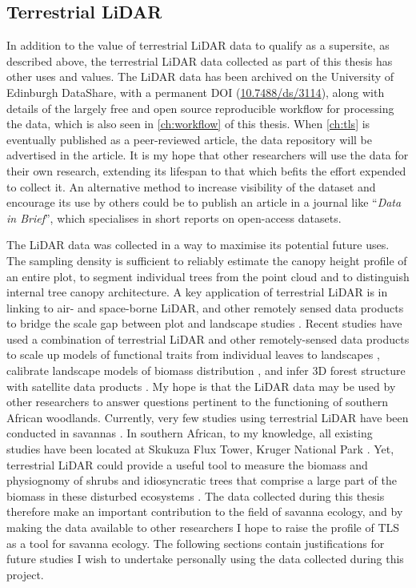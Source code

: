 \begin{refsection}
\section{Terrestrial LiDAR}
\label{legacy:sec:lidar}

In addition to the value of terrestrial LiDAR data to qualify as a supersite, as described above, the terrestrial LiDAR data collected as part of this thesis has other uses and values. The LiDAR data has been archived on the University of Edinburgh DataShare, with a permanent DOI (\href{https://doi.org/10.7488/ds/3114}{10.7488/ds/3114}), along with details of the largely free and open source reproducible workflow for processing the data, which is also seen in \autoref{ch:workflow} of this thesis. When \autoref{ch:tls} is eventually published as a peer-reviewed article, the data repository will be advertised in the article. It is my hope that other researchers will use the data for their own research, extending its lifespan to that which befits the effort expended to collect it. An alternative method to increase visibility of the dataset and encourage its use by others could be to publish an article in a journal like ``\textit{Data in Brief}'', which specialises in short reports on open-access datasets.

The LiDAR data was collected in a way to maximise its potential future uses. The sampling density is sufficient to reliably estimate the canopy height profile of an entire plot, to segment individual trees from the point cloud and to distinguish internal tree canopy architecture. A key application of terrestrial LiDAR is in linking to air- and space-borne LiDAR, and other remotely sensed data products to bridge the scale gap between plot and landscape studies \citep{Xiao2019}. Recent studies have used a combination of terrestrial LiDAR and other remotely-sensed data products to scale up models of functional traits from individual leaves to landscapes \citep{AbelleiraMartinez2016}, calibrate landscape models of biomass distribution \citep{RejouMechain2019}, and infer 3D forest structure with satellite data products \citep{Fischer2020}. My hope is that the LiDAR data may be used by other researchers to answer questions pertinent to the functioning of southern African woodlands. Currently, very few studies using terrestrial LiDAR have been conducted in savannas \citep{Muumbe2021}. In southern African, to my knowledge, all existing studies have been located at Skukuza Flux Tower, Kruger National Park \citep{Singh2018}. Yet, terrestrial LiDAR could provide a useful tool to measure the biomass and physiognomy of shrubs and idiosyncratic trees that comprise a large part of the biomass in these disturbed ecosystems \citep{Muir2018}. The data collected during this thesis therefore make an important contribution to the field of savanna ecology, and by making the data available to other researchers I hope to raise the profile of TLS as a tool for savanna ecology. The following sections contain justifications for future studies I wish to undertake personally using the data collected during this project.


\end{refsection}
